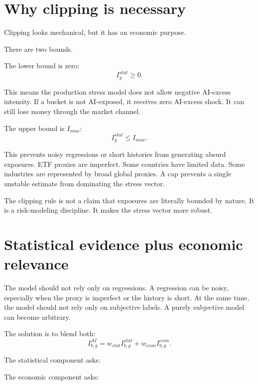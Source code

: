 \documentclass[10pt]{article}
\begin{document}
\section{Why clipping is necessary}

Clipping looks mechanical, but it has an economic purpose.

There are two bounds.

The lower bound is zero:
\[
I_y^{stat}\geq 0.
\]

This means the production stress model does not allow negative AI-excess intensity. If a bucket is not AI-exposed, it receives zero AI-excess shock. It can still lose money through the market channel.

The upper bound is $I_{max}$:
\[
I_y^{stat}\leq I_{max}.
\]

This prevents noisy regressions or short histories from generating absurd exposures. ETF proxies are imperfect. Some countries have limited data. Some industries are represented by broad global proxies. A cap prevents a single unstable estimate from dominating the stress vector.

The clipping rule is not a claim that exposures are literally bounded by nature. It is a risk-modeling discipline. It makes the stress vector more robust.

\section{Statistical evidence plus economic relevance}

The model should not rely only on regressions. A regression can be noisy, especially when the proxy is imperfect or the history is short. At the same time, the model should not rely only on subjective labels. A purely subjective model can become arbitrary.

The solution is to blend both:
\[
I_{b,g}^{AI}=w_{stat}I_{b,g}^{stat}+w_{econ}I_{b,g}^{econ}.
\]

The statistical component asks:

\begin{center}
\end{center}

The economic component asks:

\begin{center}
\end{center}
\end{document}

